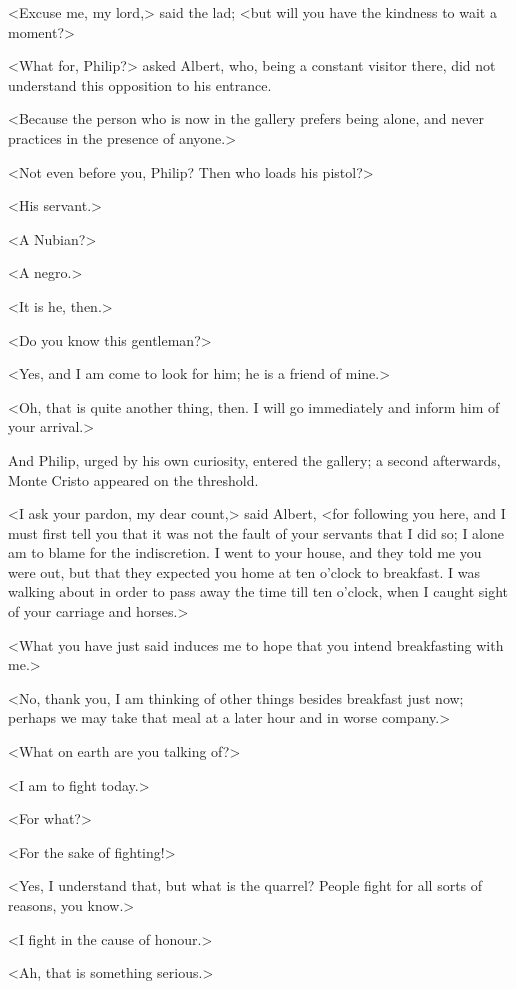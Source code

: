  <Excuse me, my lord,> said the lad; <but will you have the kindness to wait a moment?> 

 <What for, Philip?> asked Albert, who, being a constant visitor there, did not understand this opposition to his entrance. 

 <Because the person who is now in the gallery prefers being alone, and never practices in the presence of anyone.> 

 <Not even before you, Philip? Then who loads his pistol?> 

 <His servant.> 

 <A Nubian?> 

 <A negro.> 

 <It is he, then.> 

 <Do you know this gentleman?> 

 <Yes, and I am come to look for him; he is a friend of mine.> 

 <Oh, that is quite another thing, then. I will go immediately and inform him of your arrival.> 

 And Philip, urged by his own curiosity, entered the gallery; a second afterwards, Monte Cristo appeared on the threshold. 

 <I ask your pardon, my dear count,> said Albert, <for following you here, and I must first tell you that it was not the fault of your servants that I did so; I alone am to blame for the indiscretion. I went to your house, and they told me you were out, but that they expected you home at ten o'clock to breakfast. I was walking about in order to pass away the time till ten o'clock, when I caught sight of your carriage and horses.> 

 <What you have just said induces me to hope that you intend breakfasting with me.>

<No, thank you, I am thinking of other things besides breakfast just now; perhaps we may take that meal at a later hour and in worse company.> 

 <What on earth are you talking of?> 

 <I am to fight today.> 

 <For what?> 

 <For the sake of fighting!> 

 <Yes, I understand that, but what is the quarrel? People fight for all sorts of reasons, you know.> 

 <I fight in the cause of honour.> 

 <Ah, that is something serious.> 

